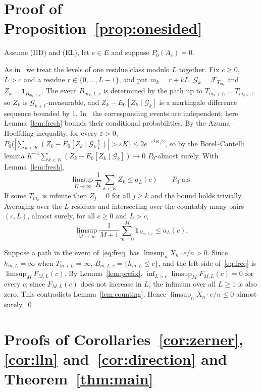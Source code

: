 \documentclass[11pt]{amsart}
\theoremstyle{remark}
\begin{document}
\section{Proof of Proposition~\ref{prop:onesided}}\label{sec:onesided}

Assume (IID) and (EL), let $e\in E$ and suppose $P_0(A_e)=0$.

As in~\cite[(14)]{Zer02} we treat the levels of one residue class modulo $L$ together. Fix $c\ge0$, $L>c$ and a residue $r\in\{0,\dots,L-1\}$, and put $m_k=r+kL$, $\mathcal G_k=\mathcal F_{T_{m_k}}$ and
$Z_k=\mathbf 1_{B_{m_k,L,c}}$. The event
$B_{m_k,L,c}$ is determined by the path up to $T_{m_k+L}=T_{m_{k+1}}$, so $Z_k$ is $\mathcal G_{k+1}$-measurable, and
$Z_k-E_0[Z_k\mid\mathcal G_k]$ is a martingale difference sequence bounded by $1$. In~\cite{Zer02} the corresponding events are independent;
here Lemma~\ref{lem:fresh} bounds their conditional probabilities. By the Azuma--Hoeffding inequality, for every
$\varepsilon>0$, $P_0\bigl(|\sum_{k<K}(Z_k-E_0[Z_k\mid\mathcal G_k])|>\varepsilon K\bigr)\le2e^{-\varepsilon^2K/2}$, so by the
Borel--Cantelli lemma $K^{-1}\sum_{k<K}(Z_k-E_0[Z_k\mid\mathcal G_k])\to0$ $P_0$-almost surely. With
Lemma~\ref{lem:fresh},
\[
\limsup_{K\to\infty}\frac1K\sum_{k<K}Z_k\le a_L(c)\qquad P_0\text{-a.s.}
\]
If some $T_{m_k}$ is infinite then $Z_j=0$ for all $j\ge k$ and the bound holds trivially. Averaging over the $L$
residues and intersecting over the countably many pairs $(c,L)$, almost surely, for all $c\ge0$ and $L>c$,
\begin{equation}\label{eq:freq}
\limsup_{M\to\infty}\frac1{M+1}\sum_{m=0}^{M}\mathbf 1_{B_{m,L,c}}\le a_L(c).
\end{equation}

Suppose a path in the event of~\eqref{eq:freq} has $\limsup_nX_n\cdot e/n>0$. Since $h_{m,L}=\infty$ when
$T_{m+L}=\infty$, $B_{m,L,c}=\{h_{m,L}\le c\}$, and the left side of~\eqref{eq:freq} is $\limsup_MF_{M,L}(c)$. By
Lemma~\ref{lem:prefix}, $\inf_{L>c}\limsup_MF_{M,L}(c)=0$ for every $c$; since $F_{M,L}(c)$ does not increase in $L$,
the infimum over all $L\ge1$ is also zero. This contradicts Lemma~\ref{lem:counting}. Hence
$\limsup_nX_n\cdot e/n\le0$ almost surely. \qed

\section{Proofs of Corollaries~\ref{cor:zerner}, \ref{cor:lln} and~\ref{cor:direction} and Theorem~\ref{thm:main}}\label{sec:proof}
\end{document}
